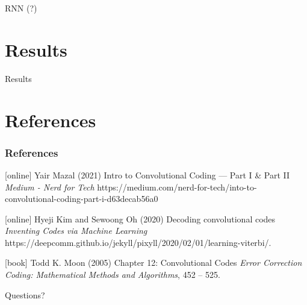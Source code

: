 \documentclass{beamer}
\newcommand{\<}				{\langle}
\renewcommand{\>}      		{\rangle}
\begin{document}
\begin{frame}{RNN (?)}


\end{frame}

\section{Results} 

\begin{frame}{Results}


\end{frame}

\section{References}

\begin{frame}
\frametitle{References}
\footnotesize{
\begin{thebibliography}{9} 

[online]
 Yair Mazal (2021)
\newblock Intro to Convolutional Coding — Part I & Part II
\newblock \emph{Medium - Nerd for Tech} https://medium.com/nerd-for-tech/into-to-convolutional-coding-part-i-d63decab56a0

[online]
 Hyeji Kim and Sewoong Oh (2020)
\newblock Decoding convolutional codes
\newblock \emph{Inventing Codes via Machine Learning} https://deepcomm.github.io/jekyll/pixyll/2020/02/01/learning-viterbi/.

[book]
 Todd K. Moon (2005)
\newblock Chapter 12: Convolutional Codes
\newblock \emph{Error Correction Coding: Mathematical Methods and Algorithms}, 452 -- 525.

\end{thebibliography}
}
\end{frame}


\begin{frame}
\Huge{\centerline{Questions?}}
\end{frame}

\end{document}
